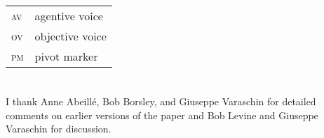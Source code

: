 \documentclass[output=paper,biblatex,babelshorthands,newtxmath,draftmode,colorlinks,citecolor=brown]{langscibook}
\begin{document}
\begin{tabularx}{.99\textwidth}{@{}lX}
\textsc{av} & agentive voice\\
\textsc{ov} & objective voice\\
\textsc{pm} & pivot marker\\
\end{tabularx}




\section*{\acknowledgmentsUS}


I thank Anne Abeillé, Bob Borsley, and Giuseppe Varaschin for detailed comments on earlier versions
of the paper and Bob Levine and Giuseppe Varaschin for discussion.








{\sloppy
\printbibliography[heading=subbibliography,notkeyword=this]
}
\end{document}
